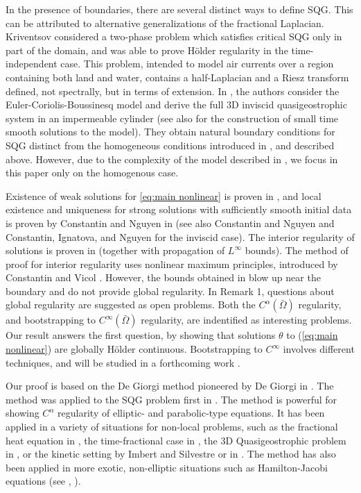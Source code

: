 \documentclass[11pt]{amsart}
\theoremstyle{remark}
\theoremstyle{definition}
\begin{document}
\vskip0.3cm

In the presence of boundaries, there are several  distinct ways to define SQG. This can be attributed  to alternative generalizations of the fractional Laplacian.  Kriventsov \cite{Kr} considered a two-phase problem which satisfies critical SQG only in part of the domain, and was able to prove H\"{o}lder regularity in the time-independent case.  This problem, intended to model air currents over a region containing both land and water, contains a half-Laplacian and a Riesz transform defined, not spectrally, but in terms of extension.  In \cite{NoVa.bounded}, the authors consider the Euler-Coriolis-Boussinesq model and derive the full 3D inviscid quasigeostrophic system in an impermeable cylinder (see also \cite{NoVa.solutions} for the construction of small time smooth solutions to the model).  They obtain natural boundary conditions for SQG distinct from the homogeneous conditions introduced in \cite{CoIg.fraclap}, \cite{CoIg.sqg} and described above. 
However, due to the complexity of the model described in \cite{NoVa.bounded}, we focus in this paper only on the homogenous case.

\vskip0.3cm
Existence of weak solutions for \eqref{eq:main nonlinear}  is proven in \cite{CoIg.fraclap}, and local existence and uniqueness for strong solutions with sufficiently smooth initial data is proven by Constantin and Nguyen in \cite{CoNg.strong} (see also Constantin and Nguyen \cite{CoNg} and Constantin, Ignatova, and Nguyen \cite{CoIgNg} for the inviscid case). The interior regularity of solutions  is proven in \cite{CoIg.sqg} (together with propagation of $L^\infty$ bounds).  The method of proof for interior regularity uses  nonlinear maximum principles, introduced by Constantin and Vicol \cite{CoVi}.   However, the bounds obtained in \cite{CoIg.sqg} blow up near the boundary and do not provide global regularity.
  In \cite{CoIg.sqg} Remark 1, questions about   global regularity are suggested as  open problems.  Both the $C^\alpha(\bar{\Omega})$ regularity,  and bootstrapping to  $C^\infty(\bar{\Omega})$ regularity, are indentified as interesting problems.  
  Our  result answers the first question, by  showing  that solutions $\theta$ to (\ref{eq:main nonlinear}) are globally H\"{o}lder continuous.
  Bootstrapping to $C^\infty$ involves different techniques, and will be studied in a forthcoming work \cite{StVa.higher}.  
\vskip0.3cm

Our proof is based on  the De Giorgi method pioneered by De Giorgi in \cite{DG}.  The method was applied to the SQG problem first in \cite{CaVa.sqg}.  The method is powerful for showing $C^\alpha$ regularity of elliptic- and parabolic-type equations. It has been applied in a variety of situations for non-local problems, such as the fractional heat equation in \cite{CaChVa.nio}, the time-fractional case in \cite{AlCaVa}, the 3D Quasigeostrophic problem in \cite{NoVa.qg}, or the kinetic setting by Imbert and Silvestre \cite{ImSi} or in \cite{St}.  The method has also been applied in more exotic, non-elliptic situations such as Hamilton-Jacobi equations (see \cite{ChVa}, \cite{StVa.hamjac}).  
\end{document}
